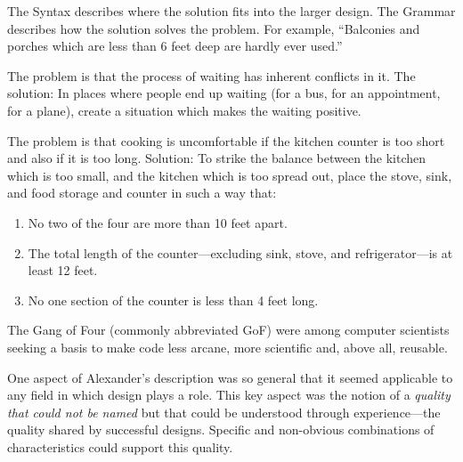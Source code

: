 \hypertarget{components-of-a-pattern-language}{%
\label{components-of-a-pattern-language}}

The Syntax describes where the solution fits into the larger design. The
Grammar describes how the solution solves the problem. For example,
``Balconies and porches which are less than 6 feet deep are hardly ever
used.''

\hypertarget{an-example-of-a-pattern-is-a-place-to-wait}{%
\label{an-example-of-a-pattern-is-a-place-to-wait}}

The problem is that the process of waiting has inherent conflicts in it.
The solution: In places where people end up waiting (for a bus, for an
appointment, for a plane), create a situation which makes the waiting
positive.

\hypertarget{an-example-of-a-pattern-is-a-useful-cooking-layout}{%
\label{an-example-of-a-pattern-is-a-useful-cooking-layout}}

The problem is that cooking is uncomfortable if the kitchen counter is
too short and also if it is too long. Solution: To strike the balance
between the kitchen which is too small, and the kitchen which is too
spread out, place the stove, sink, and food storage and counter in such
a way that:

\begin{enumerate}
\def\labelenumi{\arabic{enumi}.}
\tightlist
\item
  No two of the four are more than 10 feet apart.
\item
  The total length of the counter---excluding sink, stove, and
  refrigerator---is at least 12 feet.
\item
  No one section of the counter is less than 4 feet long.
\end{enumerate}

\hypertarget{computer-scientists-popularized-design-patterns}{%
\label{computer-scientists-popularized-design-patterns}}

The Gang of Four (commonly abbreviated GoF) were among computer
scientists seeking a basis to make code less arcane, more scientific
and, above all, reusable.

One aspect of Alexander's description was so general that it seemed
applicable to any field in which design plays a role. This key aspect
was the notion of a \emph{quality that could not be named} but that
could be understood through experience---the quality shared by
successful designs. Specific and non-obvious combinations of
characteristics could support this quality.


